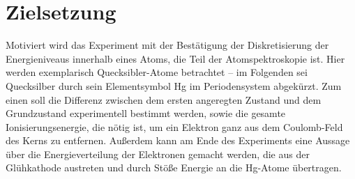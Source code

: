 \section{Zielsetzung}
\label{sec:Zielsetzung}

Motiviert wird das Experiment mit der Bestätigung der Diskretisierung der Energieniveaus innerhalb eines Atoms, die Teil der Atomspektroskopie ist.  
Hier werden exemplarisch Quecksibler-Atome betrachtet -- im Folgenden sei Quecksilber durch sein Elementsymbol Hg im Periodensystem abgekürzt. 
Zum einen soll die Differenz zwischen dem ersten angeregten Zustand und dem Grundzustand experimentell bestimmt werden, 
sowie die gesamte Ionisierungsenergie, die nötig ist, um ein Elektron ganz aus dem Coulomb-Feld des Kerns zu entfernen. 
Außerdem kann am Ende des Experiments eine Aussage über die Energieverteilung der Elektronen gemacht werden, die 
aus der Glühkathode austreten und durch Stöße Energie an die Hg-Atome übertragen. 